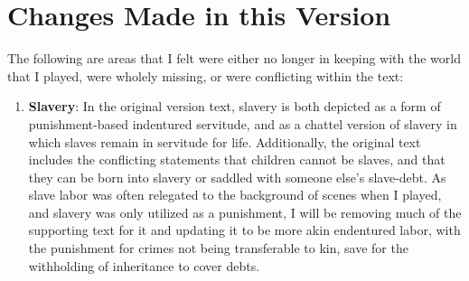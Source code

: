 \section{Changes Made in this Version}

The following are areas that I felt were either no longer in keeping with the world that I played, were wholely missing, or were conflicting within the text:
\begin{enumerate}[leftmargin=12pt]
\item \textbf{Slavery}: In the original version text, slavery is both depicted as a form of punishment-based indentured servitude, and as a chattel version of slavery in which slaves remain in servitude for life. Additionally, the original text includes the conflicting statements that children cannot be slaves, and that they can be born into slavery or saddled with someone else's slave-debt. As slave labor was often relegated to the background of scenes when I played, and slavery was only utilized as a punishment, I will be removing much of the supporting text for it and updating it to be more akin endentured labor, with the punishment for crimes not being transferable to kin, save for the withholding of inheritance to cover debts. 


\end{enumerate}
